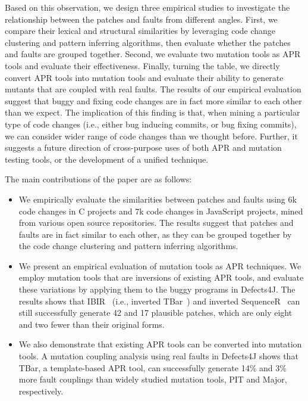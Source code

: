 \documentclass[conference]{IEEEtran}
\def\d4j{Defects4J\xspace}
\newcommand{\fixme}[1]{\textcolor{red}{\textbf{fixme:}#1}}
\begin{document}



Based on this observation, we design three empirical studies to investigate the
relationship between the patches and faults from different angles. First, we
compare their lexical and structural similarities by leveraging code change
clustering and pattern inferring algorithms, then evaluate whether the patches
and faults are grouped together. Second, we evaluate two mutation tools as
APR tools and evaluate their effectiveness. Finally, turning the table, we
directly convert APR tools into mutation tools and evaluate their ability to
generate mutants that are coupled with real faults. The results of our empirical
evaluation suggest that buggy and fixing code changes are in fact more similar
to each other than we expect. The implication of this finding is that, when
mining a particular type of code changes (i.e., either bug inducing commits, or
bug fixing commits), we can consider wider range of code changes than we
thought before. Further, it suggests a future direction of cross-purpose uses of
both APR and mutation testing tools, or the development of a unified technique.

The main contributions of the paper are as follows:

\begin{itemize}    
\item We empirically evaluate the similarities between patches and faults using 6k
code changes in C projects and 7k code changes in JavaScript projects,
mined from various open source repositories. The results suggest that patches
and faults are in fact similar to each other, as they can be grouped together by
the code change clustering and pattern inferring algorithms.

\item We present an empirical evaluation of mutation tools as APR techniques. We
employ mutation tools that are inversions of existing APR tools, and evaluate
these variations by applying them to the buggy programs in \d4j. The results
shows that IBIR~\cite{khanfir2020ibir} (i.e., inverted TBar~\cite{liu2019tbar})
and inverted SequenceR~\cite{chen2019sequencer} can still successfully generate 42 and 17
plausible patches, which are only eight and two fewer than their original forms.

\item We also demonstrate that existing APR tools can be converted into mutation
tools. A mutation coupling analysis using real faults in \d4j shows that TBar, a
template-based APR tool, can successfully generate 14\% and 3\% more fault
couplings than widely studied mutation tools, PIT and Major, respectively.
    
\end{itemize}
\end{document}
